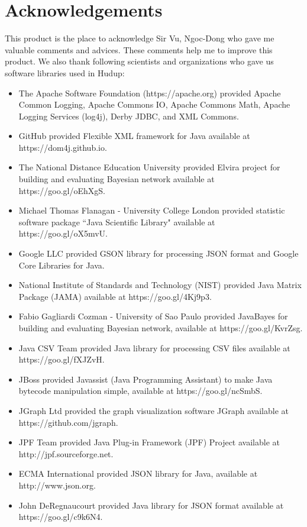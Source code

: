 \documentclass[a4paper]{llncs}
\begin{document}
\section*{Acknowledgements}
\noindent This product is the place to acknowledge Sir Vu, Ngoc-Dong who gave me valuable comments and advices. These comments help me to improve this product. We also thank following scientists and organizations who gave us software libraries used in Hudup:
\begin{itemize}
\item The Apache Software Foundation (https://apache.org) provided Apache Common Logging, Apache Commons IO, Apache Commons Math, Apache Logging Services (log4j), Derby JDBC, and XML Commons.
\item GitHub provided Flexible XML framework for Java available at https://dom4j.github.io.
\item The National Distance Education University provided Elvira project for building and evaluating Bayesian network available at https://goo.gl/oEhXgS.
\item Michael Thomas Flanagan - University College London provided statistic software package ``Java Scientific Library" available at https://goo.gl/oX5mvU.
\item Google LLC provided GSON library for processing JSON format and Google Core Libraries for Java.
\item National Institute of Standards and Technology (NIST) provided Java Matrix Package (JAMA) available at https://goo.gl/4Kj9p3.
\item Fabio Gagliardi Cozman - University of Sao Paulo provided JavaBayes for building and evaluating Bayesian network, available at https://goo.gl/KvrZsg.
\item Java CSV Team provided Java library for processing CSV files available at https://goo.gl/fXJZvH.
\item JBoss provided Javassist (Java Programming Assistant) to make Java bytecode manipulation simple, available at https://goo.gl/ncSmbS.
\item JGraph Ltd provided the graph visualization software JGraph available at https://github.com/jgraph.
\item JPF Team provided Java Plug-in Framework (JPF) Project available at http://jpf.sourceforge.net.
\item ECMA International provided JSON library for Java, available at http://www.json.org.
\item John DeRegnaucourt provided Java library for JSON format available at https://goo.gl/c9k6N4.

\end{itemize}
\end{document}
